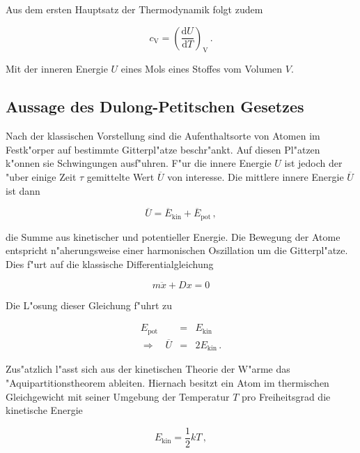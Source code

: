 		Aus dem ersten Hauptsatz der Thermodynamik folgt zudem

		\begin{equation}
			\label{eqn:blaa}
			c_\mathrm{V} = \left(\frac{\mathrm{d}U}{\mathrm{d}T}\right)_\mathrm{V} \,.
		\end{equation}

		Mit der inneren Energie $U$ eines Mols eines Stoffes vom Volumen $V$.

	\subsection{Aussage des Dulong-Petitschen Gesetzes}
	\label{subsec:dulong-petit}
		Nach der klassischen Vorstellung sind die Aufenthaltsorte von Atomen im Festk"orper auf bestimmte Gitterpl"atze beschr"ankt.
		Auf diesen Pl"atzen k"onnen sie Schwingungen ausf"uhren. F"ur die innere Energie $U$ ist jedoch der "uber einige Zeit $\tau$ gemittelte Wert $\overline{U}$ von interesse.
		Die mittlere innere Energie $\overline{U}$ ist dann

		\begin{equation*}
			\overline{U} = \overline{E}_\mathrm{kin} + \overline{E}_\mathrm{pot} \,,
		\end{equation*}

		die Summe aus kinetischer und potentieller Energie.
		Die Bewegung der Atome entspricht n"aherungsweise einer harmonischen Oszillation um die Gitterpl"atze.
		Dies f"urt auf die klassische Differentialgleichung

		\begin{equation*}
			m\ddot{x} + Dx = 0
		\end{equation*}

		Die L"osung dieser Gleichung f"uhrt zu

		\begin{eqnarray*}
			E_\mathrm{pot} & = & E_\mathrm{kin} \\
			\Rightarrow \quad \overline{U} & = & 2 E_\mathrm{kin} \,.
		\end{eqnarray*}

		Zus"atzlich l"asst sich aus der kinetischen Theorie der W"arme das "Aquipartitionstheorem ableiten.
		Hiernach besitzt ein Atom im thermischen Gleichgewicht mit seiner Umgebung der Temperatur $T$ pro Freiheitsgrad die kinetische Energie

		\begin{equation*}
			E_\mathrm{kin} = \frac{1}{2}kT \,,
		\end{equation*}

